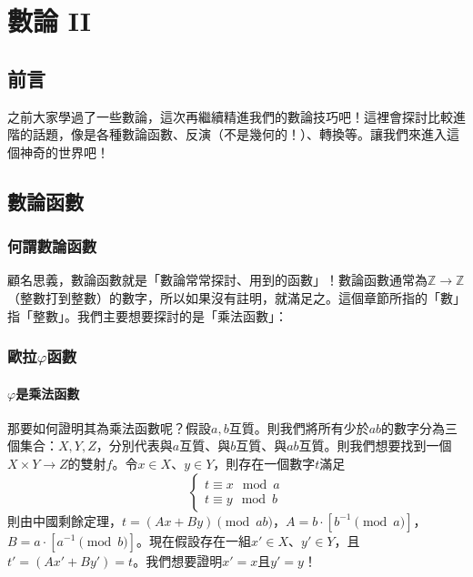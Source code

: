 \chapter{數論 II}
\section*{前言}
	之前大家學過了一些數論，這次再繼續精進我們的數論技巧吧！這裡會探討比較進階的話題，像是各種數論函數、反演（不是幾何的！）、轉換等。讓我們來進入這個神奇的世界吧！
\section*{數論函數}
	\subsection*{何謂數論函數}
	顧名思義，數論函數就是「數論常常探討、用到的函數」！數論函數通常為$\mathbb{Z} \rightarrow \mathbb{Z}$（整數打到整數）的數字，所以如果沒有註明，就滿足之。這個章節所指的「數」指「整數」。我們主要想要探討的是「乘法函數」：
	\subsection*{歐拉$\varphi$函數}
		\subsubsection{$\varphi$是乘法函數}
		那要如何證明其為乘法函數呢？假設$a, b$互質。則我們將所有少於$ab$的數字分為三個集合：$X, Y, Z$，分別代表與$a$互質、與$b$互質、與$ab$互質。則我們想要找到一個$X \times Y \rightarrow Z$的雙射$f$。令$x \in X$、$y \in Y$，則存在一個數字$t$滿足
		$$\begin{cases}
		t\equiv x \mod a\\
		t\equiv y \mod b
		\end{cases}$$
		則由中國剩餘定理，$t = (Ax + By) \pmod{ab}$，$A = b \cdot \left[b^{-1} \pmod a\right]$， $B = a \cdot \left[a^{-1} \pmod b\right]$。現在假設存在一組$x' \in X$、$y' \in Y$，且$t' = (Ax' + By') = t$。我們想要證明$x' = x$且$y' = y$！
		
